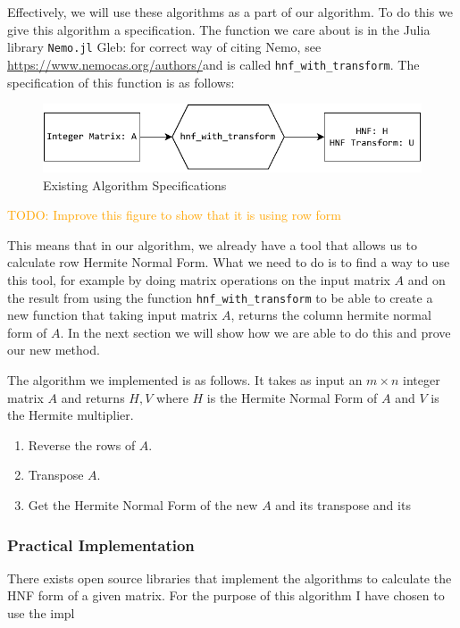 \documentclass[oneside, a4paper, onecolumn, 11pt]{article}
\newcommand{\todo}[1]{
    \begin{mdframed}
        \textcolor{orange}{
        TODO: #1
        }
    \end{mdframed}
}
\begin{document}
Effectively, we will use these algorithms as a part of our algorithm. To do this we give this algorithm a specification. The function we care about is in the Julia library \texttt{Nemo.jl} {\color{purple}Gleb: for correct way of citing Nemo, see \url{https://www.nemocas.org/authors/}}and is called \texttt{hnf\_with\_transform}. The specification of this function is as follows:
\begin{figure}[H]
    \centering
    \includegraphics{images/diagram1.pdf}
    \caption{Existing Algorithm Specifications}
    \label{fig:existingalgo}
\end{figure}
\todo{Improve this figure to show that it is using row form}

This means that in our algorithm, we already have a tool that allows us to calculate row Hermite Normal Form. What we need to do is to find a way to use this tool, for example by doing matrix operations on the input matrix \(A\) and on the result from using the function \texttt{hnf\_with\_transform} to be able to create a new function that taking input matrix \(A\), returns the column hermite normal form of \(A\). In the next section we will show how we are able to do this and prove our new method.

The algorithm we implemented is as follows. It takes as input an \(m \times n\) integer matrix \(A\) and returns \(H, V\) where \(H\) is the Hermite Normal Form of \(A\) and \(V\) is the Hermite multiplier.
\begin{enumerate}
    \item Reverse the rows of \(A\).
    \item Transpose \(A\).
    \item Get the Hermite Normal Form of the new \(A\) and its transpose and its 
\end{enumerate}

\subsubsection{Practical Implementation}

There exists open source libraries that implement the algorithms to calculate the HNF form of a given matrix. For the purpose of this algorithm I have chosen to use the impl
\end{document}
